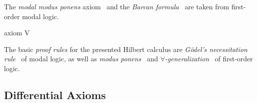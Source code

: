     The \emph{modal modus ponens} axiom~ and the \emph{Barcan formula}~ are taken from first-order modal logic.

    axiom V

    The basic \emph{proof rules} for the presented Hilbert calculus are \emph{Gödel's necessitation rule}~ of modal logic, as well as \emph{modus ponens}~ and \emph{$\forall$-generalization}~ of first-order logic.


    \subsection{Differential Axioms}
        \label{sec:differential-axioms}

        \begin{calculus}
            \cinferenceRule[]{}{
                \D{} =
            }{}
            \cinferenceRule[]{}{
                \D{} =
            }{}
            \cinferenceRule[]{}{
                \D{} =
            }{}
        \end{calculus}
    
        \begin{calculus}
        \end{calculus}

